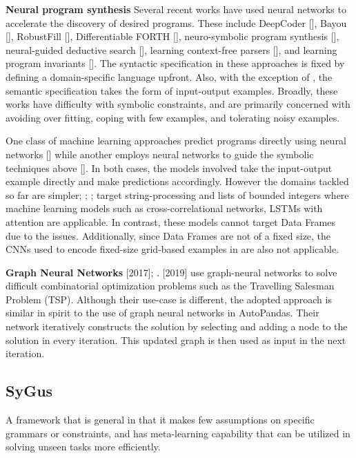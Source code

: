 \documentclass{article}
\begin{document}
\textbf{Neural program synthesis}
Several recent works have used neural networks to accelerate the discovery of desired programs. These include DeepCoder [\cite{balog2017deepcoder}], Bayou [\cite{murali2018neural}], RobustFill [\cite{pmlr-v70-devlin17a}], Differentiable FORTH [\cite{bosnjak2017programming}], neuro-symbolic program synthesis [\cite{bunel2018leveraging}], neural-guided deductive search [\cite{kalyan2018neuralguided}], learning context-free parsers [\cite{chen2018synthesizing}], and learning program invariants [\cite{Si2018}]. The syntactic specification in these approaches is fixed by defining a domain-specific language upfront. Also, with the exception of \cite{Si2018}, the semantic specification takes the form of input-output examples. Broadly, these works have difficulty with symbolic constraints, and are primarily concerned with avoiding over fitting, coping with few examples, and tolerating noisy examples.

One class of machine learning approaches predict programs directly using neural networks [\cite{parisotto2017neuro-symbolic}] while another employs neural networks to guide the symbolic techniques above [\cite{kalyan2018}]. In both cases, the models involved take the input-output example directly and make predictions accordingly. However the domains tackled so far are simpler; \cite{balog2017deepcoder}; \cite{pmlr-v70-devlin17a}; \cite{kalyan2018} target string-processing and lists of bounded integers where machine learning models such as cross-correlational networks, LSTMs with attention are applicable. In contrast, these models cannot target Data Frames due to the issues. Additionally, since Data Frames are not of a fixed size, the CNNs used to encode fixed-size grid-based examples in \cite{bunel2018leveraging} are also not applicable.

\textbf{Graph Neural Networks}
\cite{dai2018learning} [2017]; \cite{kool2018attention}. [2019] use graph-neural networks to solve difficult combinatorial optimization problems such as the Travelling Salesman Problem (TSP). Although their use-case is different, the adopted approach is similar in spirit to the use of graph neural networks in AutoPandas. Their network iteratively constructs the solution by selecting and adding a node to the solution in every iteration. This updated graph is then used as input in the next iteration.

\subsection{SyGus}
 A framework that is general in that it makes few assumptions on specific grammars or constraints, and has meta-learning capability that can be utilized in solving unseen tasks more efficiently.
\end{document}

